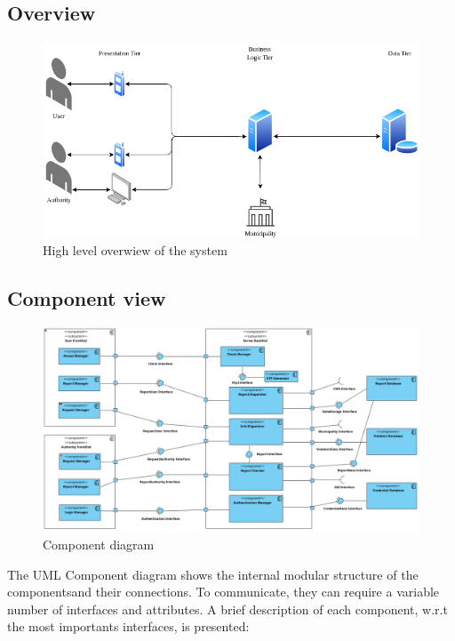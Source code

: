 \subsection{Overview}

    \begin{figure}[H]
        \includegraphics[width=\textwidth]{Images/SystemOverview.png}
        \caption{\label{fig:SystemOverview}High level overwiew of the system}
    \end{figure}
   
\newpage

\subsection{Component view}

    \begin{figure}[H]
        \includegraphics[width=\textwidth]{Images/ComponentView.png}
        \caption{\label{fig:ComponentView}Component diagram}
    \end{figure}

    The UML Component diagram shows the internal modular structure of the componentsand their connections. 
    To communicate, they can require a variable number of interfaces and attributes. 
    A brief description of each component, w.r.t the most importants interfaces, is presented:

